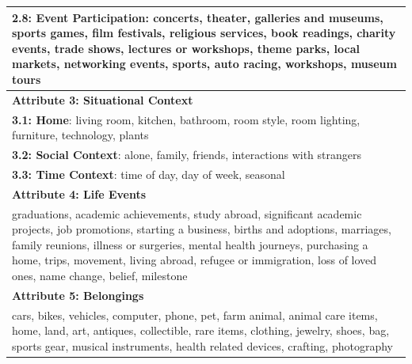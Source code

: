 \begin{table}[h]
{\begin{tabular}{p{\textwidth}}
    \textbf{2.8: Event Participation}: concerts, theater, galleries and museums, sports games, film festivals, religious services, book readings, charity events, trade shows, lectures or workshops, theme parks, local markets, networking events, sports, auto racing, workshops, museum tours \\
    \midrule
    \rowcolor{gray!20} \textbf{Attribute 3: Situational Context} \\
    \textbf{3.1: Home}: living room, kitchen, bathroom, room style, room lighting, furniture, technology, plants \\
    \textbf{3.2: Social Context}: alone, family, friends, interactions with strangers \\
    \textbf{3.3: Time Context}: time of day, day of week, seasonal \\
    \midrule
    \rowcolor{gray!20} \textbf{Attribute 4: Life Events} \\
    graduations, academic achievements, study abroad, significant academic projects, job promotions, starting a business, births and adoptions, marriages, family reunions, illness or surgeries, mental health journeys, purchasing a home, trips, movement, living abroad, refugee or immigration, loss of loved ones, name change, belief, milestone \\
    \midrule
    \rowcolor{gray!20} \textbf{Attribute 5: Belongings} \\
    cars, bikes, vehicles, computer, phone, pet, farm animal, animal care items, home, land, art, antiques, collectible, rare items, clothing, jewelry, shoes, bag, sports gear, musical instruments, health related devices, crafting, photography \\
    \bottomrule
\end{tabular}
}
\label{tab:attribute-ontology}
\end{table}


